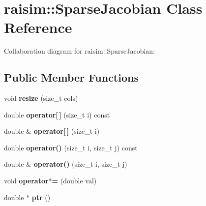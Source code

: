 \hypertarget{classraisim_1_1SparseJacobian}{}\section{raisim\+:\+:Sparse\+Jacobian Class Reference}
\label{classraisim_1_1SparseJacobian}


Collaboration diagram for raisim\+:\+:Sparse\+Jacobian\+:
\subsection*{Public Member Functions}
\begin{DoxyCompactItemize}
\item 
\mbox{\label{classraisim_1_1SparseJacobian_aeb0cd87182ff84eed2dfc48aa8ba6da1}} 
void {\bfseries resize} (size\+\_\+t cols)
\item 
\mbox{\label{classraisim_1_1SparseJacobian_a6ed212af310cb04eaf3ae00e31238b6c}} 
double {\bfseries operator\mbox{[}$\,$\mbox{]}} (size\+\_\+t i) const
\item 
\mbox{\label{classraisim_1_1SparseJacobian_a2d7a5466a454a272682e91663bba663e}} 
double \& {\bfseries operator\mbox{[}$\,$\mbox{]}} (size\+\_\+t i)
\item 
\mbox{\label{classraisim_1_1SparseJacobian_a5e5f6521b53004b2d7bfedbfdc685e46}} 
double {\bfseries operator()} (size\+\_\+t i, size\+\_\+t j) const
\item 
\mbox{\label{classraisim_1_1SparseJacobian_a2766be541c1e974b60e8e631c81c06db}} 
double \& {\bfseries operator()} (size\+\_\+t i, size\+\_\+t j)
\item 
\mbox{\label{classraisim_1_1SparseJacobian_a554fe655b56076832fa1903833b60001}} 
void {\bfseries operator$\ast$=} (double val)
\item 
\mbox{\label{classraisim_1_1SparseJacobian_afd5bbd9128b687274c38c5b68cd36cad}} 
double $\ast$ {\bfseries ptr} ()
\item 

\end{DoxyCompactItemize}
